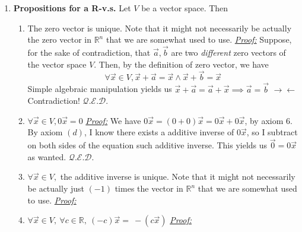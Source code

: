\documentclass[oneside, 12pt]{book}
\newcommand{\settag}[1]{\renewcommand{\theenumi}{#1}}
\newcommand{\qed}{\hfill $\mathcal{Q}.\mathcal{E}.\mathcal{D}.$}
\newcommand{\tit}[1]{\textit{#1}}
\newcommand{\vx}{\vec{x}}
\begin{document}
\begin{enumerate}
    \settag{1.1.6}
    \item \textbf{Propositions for a R-v.s.} Let $V$ be a vector space. Then 
    \begin{enumerate}
        \item The zero vector is unique. Note that it might not necessarily be actually the zero vector in $\mathbb{R}^n$ that we are somewhat used to use.\newline
        \tit{\underline{Proof:}} Suppose, for the sake of contradiction, that $\vec{a},\vec{b}$ are two \tit{different} zero vectors of the vector space $V$. Then, by the definition of zero vector, we have 
        \begin{equation*}
            \forall \vec{x}\in V,\vec{x} +\vec{a} = \vec{x} \wedge \vec{x} + \vec{b} = \vec{x}
        \end{equation*}
        Simple algebraic manipulation yields us $\vec{x} + \vec{a} = \vec{a} + \vec{x} \implies \vec{a} = \vec{b}$ $\longrightarrow\!\longleftarrow$ Contradiction! \qed
        
        \item $\forall \vec{x} \in V, 0\vec{x}=0$ \newline
        \tit{\underline{Proof:}} We have $0\vx = (0+0)\vx =0\vx +0\vx$, by axiom 6. By axiom $(d)$, I know there exists a additive inverse of $0\vx$, so I subtract on both sides of the equation such additive inverse. This yields us $\vec{0} = 0\vx$ as wanted. \qed
        
        \item $\forall \vec{x} \in V, $ the additive inverse is unique. Note that it might not necessarily be actually just $(-1)$ times the vector in $\mathbb{R}^n$ that we are somewhat used to use. \newline
        \tit{\underline{Proof:}} 
        
        \item $\forall \vec{x} \in V,~\forall c\in \mathbb{R}, ~(-c)\vec{x}=~-(c\vec{x})$ \newline
        \tit{\underline{Proof:}} 
        
    \end{enumerate}
\end{enumerate}
\end{document}
